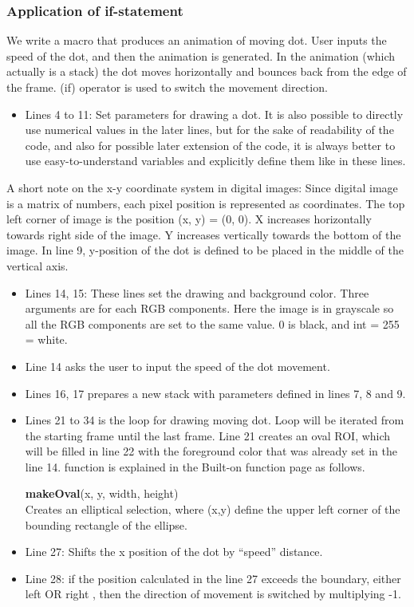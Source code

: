 \subsubsection{Application of if-statement}
\label{sec:dotmove}

We write a macro that produces an animation of moving dot. User inputs the speed
of the dot, and then the animation is generated. In the animation (which
actually is a stack) the dot moves horizontally and bounces back from the edge
of the frame. \ilcom(if) operator is used to switch the movement direction.


\begin{itemize}
\item Lines 4 to 11: Set parameters for drawing a dot. It is also possible to directly use numerical values in the later lines, but for the sake of readability of the code, and also for possible later extension of the code, it is always better to use easy-to-understand variables and explicitly define them like in these lines. 
\end{itemize}
A short note on the x-y coordinate system in digital images: Since digital image is a matrix of numbers, each pixel position is represented as coordinates. The top left corner of image is the position (x, y) = (0, 0). X increases horizontally towards right side of the image. Y increases vertically towards the bottom of the image.  In line 9, y-position of the dot is defined to be placed in the middle of the vertical axis. 
\begin{itemize}
\item Lines 14, 15: These lines set the drawing and background color. Three arguments are for each RGB components. Here the image is in grayscale so all the RGB components are set to the same value. 0 is black, and int = 255 = white.
\item Line 14 asks the user to input the speed of the dot movement.
\item Lines 16, 17 prepares a new stack with parameters defined in lines 7, 8 and 9.
\item Lines 21 to 34 is the loop for drawing moving dot. Loop will be iterated from the starting frame until the last frame. Line 21 creates an oval ROI, which will be filled in line 22 with the foreground color that was already set in the line 14.  function is explained in the Built-on function page as follows.

\begin{indentCom}
\textbf{makeOval}(x, y, width, height)\\
Creates an elliptical selection, where (x,y) define the upper left corner of the bounding rectangle of the ellipse. 
\end{indentCom}
\item Line 27: Shifts the x position of the dot by ``speed'' distance. 
\item Line 28: if the position calculated in the line 27 exceeds the boundary, either left  OR right , then the direction of movement is switched by multiplying -1.
\end{itemize}
